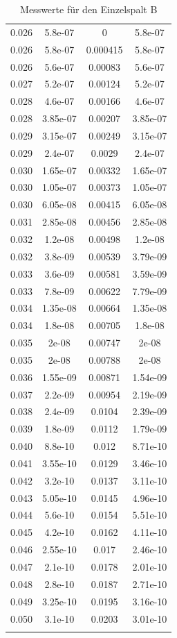 \documentclass[11pt,ngerman,a4paper]{article}
\begin{document}
\begin{longtable}{SSSS}
0.026 & 5.8e-07 & 0 & 5.8e-07\\
0.026 & 5.8e-07 & 0.000415 & 5.8e-07\\
0.026 & 5.6e-07 & 0.00083 & 5.6e-07\\
0.027 & 5.2e-07 & 0.00124 & 5.2e-07\\
0.028 & 4.6e-07 & 0.00166 & 4.6e-07\\
0.028 & 3.85e-07 & 0.00207 & 3.85e-07\\
0.029 & 3.15e-07 & 0.00249 & 3.15e-07\\
0.029 & 2.4e-07 & 0.0029 & 2.4e-07\\
0.030 & 1.65e-07 & 0.00332 & 1.65e-07\\
0.030 & 1.05e-07 & 0.00373 & 1.05e-07\\
0.030 & 6.05e-08 & 0.00415 & 6.05e-08\\
0.031 & 2.85e-08 & 0.00456 & 2.85e-08\\
0.032 & 1.2e-08 & 0.00498 & 1.2e-08\\
0.032 & 3.8e-09 & 0.00539 & 3.79e-09\\
0.033 & 3.6e-09 & 0.00581 & 3.59e-09\\
0.033 & 7.8e-09 & 0.00622 & 7.79e-09\\
0.034 & 1.35e-08 & 0.00664 & 1.35e-08\\
0.034 & 1.8e-08 & 0.00705 & 1.8e-08\\
0.035 & 2e-08 & 0.00747 & 2e-08\\
0.035 & 2e-08 & 0.00788 & 2e-08\\
0.036 & 1.55e-09 & 0.00871 & 1.54e-09\\
0.037 & 2.2e-09 & 0.00954 & 2.19e-09\\
0.038 & 2.4e-09 & 0.0104 & 2.39e-09\\
0.039 & 1.8e-09 & 0.0112 & 1.79e-09\\
0.040 & 8.8e-10 & 0.012 & 8.71e-10\\
0.041 & 3.55e-10 & 0.0129 & 3.46e-10\\
0.042 & 3.2e-10 & 0.0137 & 3.11e-10\\
0.043 & 5.05e-10 & 0.0145 & 4.96e-10\\
0.044 & 5.6e-10 & 0.0154 & 5.51e-10\\
0.045 & 4.2e-10 & 0.0162 & 4.11e-10\\
0.046 & 2.55e-10 & 0.017 & 2.46e-10\\
0.047 & 2.1e-10 & 0.0178 & 2.01e-10\\
0.048 & 2.8e-10 & 0.0187 & 2.71e-10\\
0.049 & 3.25e-10 & 0.0195 & 3.16e-10\\
0.050 & 3.1e-10 & 0.0203 & 3.01e-10\\
\bottomrule
\caption{Messwerte für den Einzelspalt B}
\end{longtable}
\end{document}
